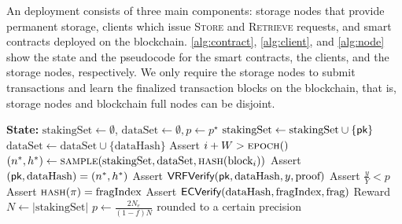 An \sys deployment consists of three main components: storage nodes that provide permanent storage, clients which issue \textsc{Store} and \textsc{Retrieve} requests, and \sys smart contracts deployed on the blockchain.
\cref{alg:contract}, \cref{alg:client}, and \cref{alg:node} show the state and the pseudocode for the smart contracts, the clients, and the storage nodes, respectively.
We only require the storage nodes to submit transactions and learn the finalized transaction blocks on the blockchain, that is, storage nodes and blockchain full nodes can be disjoint.

\begin{algorithm}
\caption{On-chain smart contracts.
\textsc{epoch()} returns current block height, and block$_i$ is the block at height $i$.
\textsc{Stake} and \textsc{Store} transactions are presented with simplification.}
\label{alg:contract}
\begin{algorithmic}[1]
\State \textbf{State:} $\text{stakingSet} \gets \emptyset$, $\text{dataSet} \gets \emptyset, p \gets p^\star$
    \State $\text{stakingSet} \gets \text{stakingSet} \cup \{\textsf{pk}\}$
\EndProcedure
{}
    \State $\text{dataSet} \gets \text{dataSet} \cup \{\text{dataHash}\}$
\EndProcedure
{}
    \State Assert $i+W>\textsc{epoch}()$
    \State $(n^*, h^*) \gets \textsc{sample}(\text{stakingSet}, \text{dataSet}, \textsc{hash}({\text{block}_i}))$
    \State Assert $(\textsf{pk}, \text{dataHash}) = (n^*, h^*)$
    \State Assert $\textsf{VRFVerify}(\textsf{pk}, \text{dataHash}, y, \text{proof})$
    \State Assert $\frac{y}{Y}<p$
    \State Assert $\textsc{hash}(\pi) = \text{fragIndex}$
    \State Assert $\textsf{ECVerify}(\text{dataHash}, \text{fragIndex}, \text{frag})$
    \State Reward \pk
\EndProcedure
{}
    \State $N \gets \left|\text{stakingSet}\right|$
    \State $p \gets \frac{2N_e}{(1-f)N}$ rounded to a certain precision
\EndProcedure
\end{algorithmic}
\end{algorithm}

